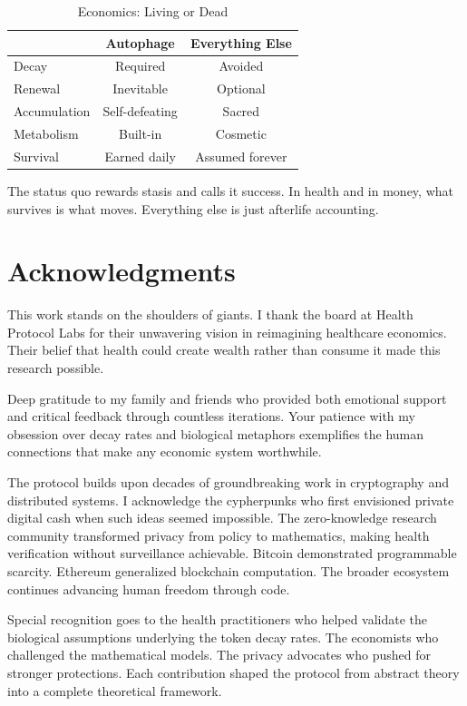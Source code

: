 \documentclass[11pt,letterpaper]{article}
\begin{document}
\begin{table}[H]
\centering
\caption*{Economics: Living or Dead}
\begin{tabular}{lcc}
\toprule
& \textbf{Autophage} & \textbf{Everything Else} \\
\midrule
Decay & Required & Avoided \\
Renewal & Inevitable & Optional \\
Accumulation & Self-defeating & Sacred \\
Metabolism & Built-in & Cosmetic \\
Survival & Earned daily & Assumed forever \\
\bottomrule
\end{tabular}
\end{table}

The status quo rewards stasis and calls it success. In health and in money, what survives is what moves. Everything else is just afterlife accounting.

\section{Acknowledgments}

This work stands on the shoulders of giants. I thank the board at Health Protocol Labs for their unwavering vision in reimagining healthcare economics. Their belief that health could create wealth rather than consume it made this research possible.

Deep gratitude to my family and friends who provided both emotional support and critical feedback through countless iterations. Your patience with my obsession over decay rates and biological metaphors exemplifies the human connections that make any economic system worthwhile.

The protocol builds upon decades of groundbreaking work in cryptography and distributed systems. I acknowledge the cypherpunks who first envisioned private digital cash when such ideas seemed impossible. The zero-knowledge research community transformed privacy from policy to mathematics, making health verification without surveillance achievable. Bitcoin demonstrated programmable scarcity. Ethereum generalized blockchain computation. The broader ecosystem continues advancing human freedom through code.

Special recognition goes to the health practitioners who helped validate the biological assumptions underlying the token decay rates. The economists who challenged the mathematical models. The privacy advocates who pushed for stronger protections. Each contribution shaped the protocol from abstract theory into a complete theoretical framework.
\end{document}
